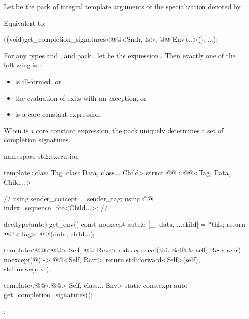 \begin{itemdescr}
\pnum
Let  be the pack of integral template arguments of
the  specialization denoted by
.

\pnum
\effects
Equivalent to:
\begin{codeblock}
((void)get_completion_signatures<@@<Sndr, Is>, @@(Env)...>(), ...);
\end{codeblock}

\pnum
\begin{note}
For any types  and , and pack ,
let  be the expression
.
Then exactly one of the following is :
\begin{itemize}
\item {} is ill-formed, or
\item the evaluation of  exits with an exception, or
\item {} is a core constant expression.
\end{itemize}
When  is a core constant expression,
the pack  uniquely determines a set of completion signatures.
\end{note}
\end{itemdescr}

\pnum
\begin{codeblock}
namespace std::execution {
  template<class Tag, class Data, class... Child>
  struct @@ : @@<Tag, Data, Child...> {     // \expos
    using sender_concept = sender_tag;
    using @@ = index_sequence_for<Child...>;           // \expos

    decltype(auto) get_env() const noexcept {
      auto& [_, data, ...child] = *this;
      return @@<Tag>::@@(data, child...);
    }

    template<@@<@@> Self, @@ Rcvr>
    auto connect(this Self&& self, Rcvr rcvr) noexcept(@\seebelow@)
      -> @@<Self, Rcvr> {
      return {std::forward<Self>(self), std::move(rcvr)};
    }

    template<@@<@@> Self, class... Env>
    static constexpr auto get_completion_signatures();
  };
}
\end{codeblock}

